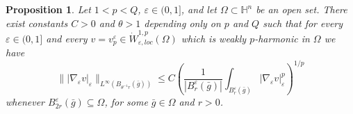 \documentclass[10pt]{amsart}
\numberwithin{equation}{section}
\newtheorem{proposition}[theorem]{Proposition}
\theoremstyle{definition}
\newcommand{\He}{\mathbb{H}}
\begin{document}
\begin{proposition}
\label{uniform-capogna-citti}
Let  $1<p<Q$, $\varepsilon \in (0,1]$, and let $\Omega \subset \He^n$ be an open set. There exist constants $C>0$ and $\theta> 1$ depending only on $p$ and $Q$ such that for every $\varepsilon \in (0,1]$  and every $v=v^\varepsilon_p \in \dot{W}
^{1,p}_{ \varepsilon,loc} (\Omega)$ which is weakly $p$-harmonic in $\Omega$ we have
\begin{equation}
\label{capogna-citti-bound} 
\| |\nabla_\varepsilon v|_\varepsilon  \|_{L^\infty(B_{\theta^{-1}r}(\bar{g}))} \leq C  \left( \frac{1}{|B_{ r}^\varepsilon(\bar{g})|}  \int_{ B_{r}^\varepsilon(\bar{g})} |\nabla_\varepsilon v|_\varepsilon^p \right)^{1/p}
	\end{equation}
whenever $B_{2  r}^\varepsilon (\bar{g}) \subseteq  \Omega$, for some $\bar{g} \in \Omega$ and $r >0$. 
\end{proposition}
\end{document}
